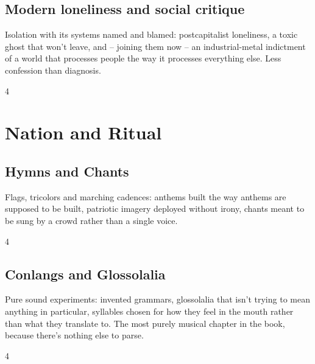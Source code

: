 \documentclass[a4paper,landscape]{memoir}
\begin{document}
\chapter{Modern loneliness and social critique}
Isolation with its systems named and blamed: postcapitalist loneliness, a toxic ghost that won't leave, and -- joining them now -- an industrial-metal indictment of a world that processes people the way it processes everything else. Less confession than diagnosis.
\clearpage\begin{multicols*}{4}






\end{multicols*}

\part{Nation and Ritual}

\chapter{Hymns and Chants}
Flags, tricolors and marching cadences: anthems built the way anthems are supposed to be built, patriotic imagery deployed without irony, chants meant to be sung by a crowd rather than a single voice.
\clearpage\begin{multicols*}{4}












\end{multicols*}

\chapter{Conlangs and Glossolalia}
Pure sound experiments: invented grammars, glossolalia that isn't trying to mean anything in particular, syllables chosen for how they feel in the mouth rather than what they translate to. The most purely musical chapter in the book, because there's nothing else to parse.
\clearpage\begin{multicols*}{4}









\end{multicols*}
\end{document}
